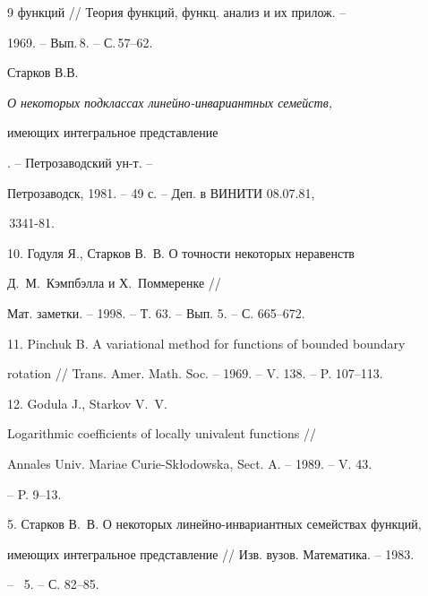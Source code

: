 \begin{thebibliography}{9}
{функций} // Теория функций, функц. анализ и их прилож. --


1969. -- Вып.\,8. -- С.\,57--62.




Старков В.В. {\em О некоторых подклассах линейно-инвариантных семейств,


имеющих интегральное представление}. -- Петрозаводский ун-т. --


Петрозаводск, 1981. -- 49 с. -- Деп. в ВИНИТИ 08.07.81, 


\No\,3341-81. 





\end{thebibliography}





\vskip 2cm












\label{end}













10. Годуля Я., Старков В.~В. О точности некоторых неравенств


Д.~М.~Кэмпбэлла и Х.~Поммеренке //


Мат. заметки. -- 1998. -- Т. 63. -- Вып. 5. -- С. 665--672.


\bibitem{}


11. Pinchuk B. A variational method for functions of bounded boundary


rotation // Trans. Amer. Math. Soc. -- 1969. -- V. 138. -- P. 107--113.


\bibitem{}


12. Godula J., Starkov V.~V.


 Logarithmic coefficients of locally univalent functions //


Annales Univ. Mariae Curie-Sk\l odowska, Sect. A. -- 1989. -- V. 43.


-- P. 9--13.


\bibitem{}


5. Старков В.~В. О некоторых линейно-инвариантных семействах функций,


имеющих интегральное представление // Изв. вузов. Математика. -- 1983.


-- \No\ 5. -- С. 82--85.


